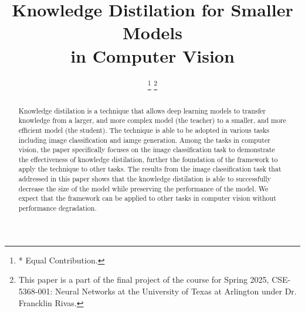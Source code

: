 \documentclass[conference]{IEEEtran}
\begin{document}
\title{
    Knowledge Distilation for Smaller Models\\in Computer Vision
}

\author{
\thanks{* Equal Contribution.}
\thanks{This paper is a part of the final project of the course for Spring 2025, CSE-5368-001: Neural Networks at the University of Texas at Arlington under Dr. Francklin Rivas.}
}

\maketitle

\begin{abstract}
    Knowledge distilation is a technique that allows deep learning models
    to transfer knowledge from a larger, and more complex model (the teacher)
    to a smaller, and more efficient model (the student).
    The technique is able to be adopted in various tasks
    including image classification and iamge generation.
    Among the tasks in computer vision,
    the paper specifically focuses on the image classification task
    to demonstrate the effectiveness of knowledge distilation,
    further the foundation of the framework to apply the technique to other tasks.
    The results from the image classification task that addressed in this paper
    shows that the knowledge distilation is able to successfully decrease the size of the model
    while preserving the performance of the model.
    We expect that the framework can be applied to other tasks in computer vision without performance degradation.
\end{abstract}
\end{document}
